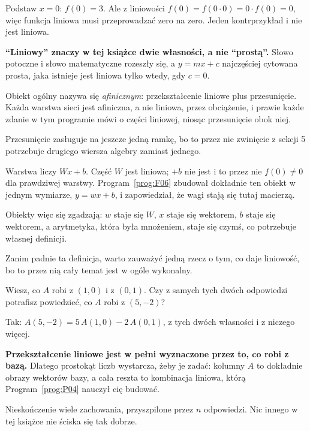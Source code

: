 \begin{fr}
Podstaw $x = 0$: $f(0) = 3$. Ale z liniowości $f(0) = f(0 \cdot 0) = 0 \cdot
f(0) = 0$, więc funkcja liniowa musi przeprowadzać zero na zero. Jeden
kontrprzykład i nie jest liniowa.

\begin{trapbox}
\textbf{\enquote{Liniowy} znaczy w tej książce dwie własności, a nie
\enquote{prostą}.} Słowo potoczne i słowo matematyczne rozeszły się, a
$y = mx + c$ \dash{} najczęściej cytowana prosta, jaka istnieje \dash{} jest
liniowa tylko wtedy, gdy $c = 0$.

Obiekt ogólny nazywa się \emph{afinicznym}: przekształcenie liniowe plus
przesunięcie. Każda warstwa sieci jest afiniczna, a nie liniowa, przez
obciążenie, i prawie każde zdanie w tym programie mówi o części liniowej,
niosąc przesunięcie obok niej.
\end{trapbox}
\end{fr}

\begin{fr}
Przesunięcie zasługuje na jeszcze jedną ramkę, bo to przez nie zwinięcie z
sekcji 5 potrzebuje drugiego wiersza algebry zamiast jednego.

Warstwa liczy $Wx + b$. Część $W$ jest liniowa; $+ b$ nie jest i to przez nie
$f(0) \neq 0$ dla prawdziwej warstwy. Program~\ref{prog:F06} zbudował dokładnie
ten obiekt w jednym wymiarze, $y = wx + b$, i zapowiedział, że wagi stają się
tutaj macierzą.

Obiekty więc się zgadzają: $w$ staje się $W$, $x$ staje się wektorem, $b$ staje
się wektorem, a arytmetyka, która była mnożeniem, staje się czymś, co
potrzebuje własnej definicji.
\end{fr}

\begin{fr}
Zanim padnie ta definicja, warto zauważyć jedną rzecz o tym, co daje liniowość,
bo to przez nią cały temat jest w ogóle wykonalny.

Wiesz, co $A$ robi z $(1, 0)$ i z $(0, 1)$. Czy z samych tych dwóch odpowiedzi
potrafisz powiedzieć, co $A$ robi z $(5, -2)$?
\nextframe
\end{fr}

\begin{fr}
\begin{ansblock}
Tak: $A(5, -2) = 5\,A(1, 0) - 2\,A(0, 1)$, z tych dwóch własności i z niczego
więcej.
\end{ansblock}

\textbf{Przekształcenie liniowe jest w pełni wyznaczone przez to, co robi z
bazą.} Dlatego prostokąt liczb wystarcza, żeby je zadać: kolumny $A$ to
dokładnie obrazy wektorów bazy, a cała reszta to kombinacja liniowa, którą
Program~\ref{prog:P04} nauczył cię budować.

Nieskończenie wiele zachowania, przyszpilone przez $n$ odpowiedzi. Nic innego w
tej książce nie ściska się tak dobrze.
\end{fr}

